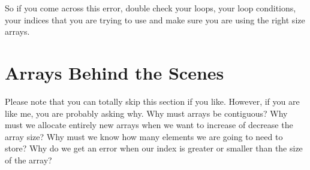 \documentclass[11]{article}
\begin{document}
So if you come across this error, double check your loops, your loop conditions, your indices that you are trying to use and make sure you are using the right size arrays.

\section{Arrays Behind the Scenes}
Please note that you can totally skip this section if you like. However, if you are like me, you are probably asking why. Why must arrays be contiguous? Why must we allocate entirely new arrays when we want to increase of decrease the array size? Why must we know how many elements we are going to need to store? Why do we get an error when our index is greater or smaller than the size of the array?
\end{document}
